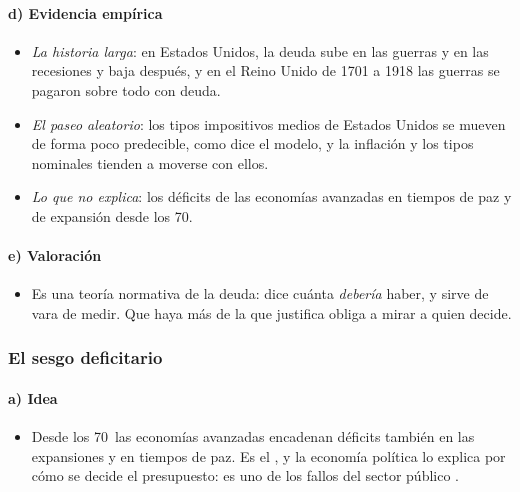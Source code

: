 \documentclass[11pt]{article}
\begin{document}
\paragraph{d) Evidencia empírica}

\begin{itemize}
\item \emph{La historia larga}: en Estados Unidos, la deuda sube en las guerras y en las recesiones y baja después\nocite{Barro1979Determination,Barro1986US}, y en el Reino Unido de 1701 a 1918 las guerras se pagaron sobre todo con deuda\nocite{Barro1987Government}.
\item \emph{El paseo aleatorio}: los tipos impositivos medios de Estados Unidos se mueven de forma poco predecible, como dice el modelo, y la inflación y los tipos nominales tienden a moverse con ellos\nocite{Mankiw1987Optimal}.
\item \emph{Lo que no explica}: los déficits de las economías avanzadas en tiempos de paz y de expansión desde los 70\nocite{Romer2019Advanced}.
\end{itemize}

\paragraph{e) Valoración}

\begin{itemize}
\item Es una teoría normativa de la deuda: dice cuánta \emph{debería} haber, y sirve de vara de medir. Que haya más de la que justifica obliga a mirar a quien decide.
\end{itemize}

\subsubsection{El sesgo deficitario}\label{sec:sesgo}

\paragraph{a) Idea}

\begin{itemize}
\item Desde los 70~las economías avanzadas encadenan déficits también en las expansiones y en tiempos de paz. Es el , y la economía política lo explica por cómo se decide el presupuesto\nocite{PerssonTabellini2000Political}: es uno de los fallos del sector público .
\end{itemize}
\end{document}
